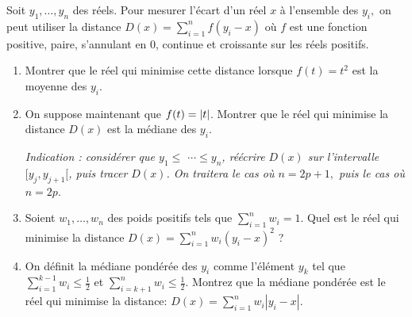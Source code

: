 \documentclass{../headers/td_upc}
\providecommand{\1}{\mathds{1}}
\begin{document}
	
	\cor{\newpage}
	
	\exo{\!\!\!\!*} 
	Soit $y_{1}, \ldots, y_{n}$ des réels. Pour mesurer l'écart d'un réel $x$ à l'ensemble des $y_{i},$ on peut utiliser la distance $D(x)=\sum_{i=1}^{n} f\left(y_{i}-x\right)$ où $f$ est une fonction positive, paire, s'annulant en 0, continue et croissante sur les réels positifs.
	\begin{enumerate}
		\item Montrer que le réel qui minimise cette distance lorsque $f(t)=t^{2}$ est la moyenne des $y_{i}$.
		\item On suppose maintenant que $f(t)=\left\lvert t\right\rvert$. Montrer que le réel qui minimise la distance $D(x)$ est la médiane des $y_{i}$.
		
		{\it Indication : considérer que $y_{1} \leq$ $\cdots \leq y_{n}$, réécrire $D(x)$ sur l'intervalle $[y_{j}, y_{j+1}[$, puis tracer $D(x)$.
		On traitera le cas où $n=2 p+1,$ puis le cas où $n=2 p$}.
		
		
		\item Soient $w_{1}, \ldots, w_{n}$ des poids positifs tels que $\sum_{i=1}^n w_i = 1$.
		Quel est le réel qui minimise la distance 
		\(
		D(x) = \sum_{i=1}^n w_i (y_i - x)^2
		\) ?
		\item On définit la médiane pondérée des $y_i$ comme l'élément $y_k$ tel que
		\(
		\sum_{i=1}^{k-1} w_i \leq \frac{1}{2}
		\)
		et
		\(
		\sum_{i=k+1}^n w_i \leq \frac{1}{2}.
		\)
		Montrez que la médiane pondérée est le réel qui minimise la distance\;:
		\(
		D(x) = \sum_{i=1}^n w_i |y_i - x|
		\).
	\end{enumerate}
	
\end{document}
